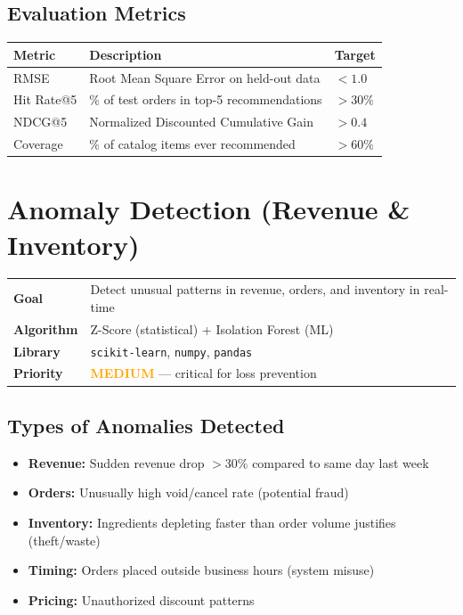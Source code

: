 \documentclass[12pt, a4paper]{article}
\begin{document}
\subsection{Evaluation Metrics}
\begin{center}
\begin{tabular}{lll}
\toprule
\textbf{Metric} & \textbf{Description} & \textbf{Target} \\
\midrule
RMSE       & Root Mean Square Error on held-out data     & $< 1.0$ \\
Hit Rate@5 & \% of test orders in top-5 recommendations & $> 30\%$ \\
NDCG@5     & Normalized Discounted Cumulative Gain      & $> 0.4$ \\
Coverage   & \% of catalog items ever recommended       & $> 60\%$ \\
\bottomrule
\end{tabular}
\end{center}


\newpage
\section{Anomaly Detection (Revenue \& Inventory)}

\begin{infobox}
\begin{tabularx}{\textwidth}{@{}lX@{}}
\textbf{Goal}       & Detect unusual patterns in revenue, orders, and inventory in real-time \\
\textbf{Algorithm}  & Z-Score (statistical) + Isolation Forest (ML) \\
\textbf{Library}    & \texttt{scikit-learn}, \texttt{numpy}, \texttt{pandas} \\
\textbf{Priority}   & \textcolor{orange}{\textbf{MEDIUM}} --- critical for loss prevention \\
\end{tabularx}
\end{infobox}


\subsection{Types of Anomalies Detected}
\begin{itemize}[nosep]
    \item \textbf{Revenue:} Sudden revenue drop $> 30\%$ compared to same day last week
    \item \textbf{Orders:} Unusually high void/cancel rate (potential fraud)
    \item \textbf{Inventory:} Ingredients depleting faster than order volume justifies (theft/waste)
    \item \textbf{Timing:} Orders placed outside business hours (system misuse)
    \item \textbf{Pricing:} Unauthorized discount patterns
\end{itemize}
\end{document}
